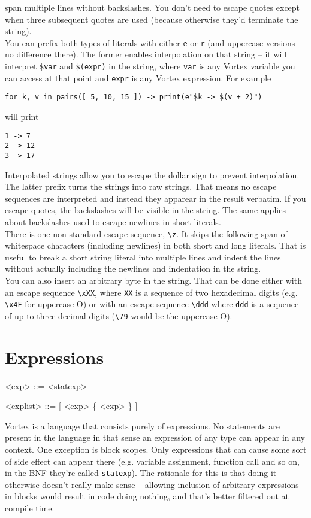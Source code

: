 \documentclass{article}
\newenvironment{bnf}
{
\begin{mdframed}
\begin{grammar}
}
{
\end{grammar}
\end{mdframed}
}
\begin{document}
span multiple lines without backslashes. You don't need to escape quotes except
when three subsequent quotes are used (because otherwise they'd terminate the
string).\\
You can prefix both types of literals with either \verb|e| or \verb|r| (and
uppercase versions -- no difference there). The former enables interpolation
on that string -- it will interpret \verb|$var| and \verb|$(expr)| in the
string, where \verb|var| is any Vortex variable you can access at that point
and \verb|expr| is any Vortex expression. For example
\begin{lstlisting}[language=vortex]
for k, v in pairs([ 5, 10, 15 ]) -> print(e"$k -> $(v + 2)")
\end{lstlisting}
will print
\begin{lstlisting}[language=text]
1 -> 7
2 -> 12
3 -> 17
\end{lstlisting}
Interpolated strings allow you to escape the dollar sign to prevent
interpolation.
\\
The latter prefix turns the strings into raw strings. That means no escape
sequences are interpreted and instead they apparear in the result verbatim.
If you escape quotes, the backslashes will be visible in the string. The same
applies about backslashes used to escape newlines in short literals.\\
There is one non-standard escape sequence, \verb|\z|. It skips the following
span of whitespace characters (including newlines) in both short and long
literals. That is useful to break a short string literal into multiple lines
and indent the lines without actually including the newlines and indentation
in the string.\\
You can also insert an arbitrary byte in the string. That can be done either
with an escape sequence \verb|\xXX|, where \verb|XX| is a sequence of two
hexadecimal digits (e.g. \verb|\x4F| for uppercase O) or with an escape
sequence \verb|\ddd| where \verb|ddd| is a sequence of up to three decimal
digits (\verb|\79| would be the uppercase O).

\section{Expressions}
\begin{bnf}
<exp> ::= <statexp>

<explist> ::= [ <exp> \{ \lit{,} <exp> \} ]
\end{bnf}
Vortex is a language that consists purely of expressions. No statements are
present in the language in that sense an expression of any type can appear
in any context. One exception is block scopes. Only expressions that can
cause some sort of side effect can appear there (e.g. variable assignment,
function call and so on, in the BNF they're called \verb|statexp|).
The rationale for this is that doing it otherwise doesn't really make sense
-- allowing inclusion of arbitrary expressions in blocks would result in code
doing nothing, and that's better filtered out at compile time.
\end{document}
